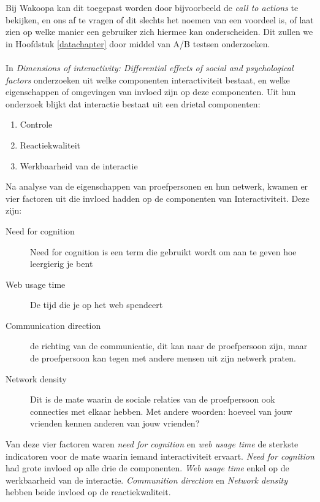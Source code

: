 \documentclass[a4paper, 10pt, pdftex]{article}
\begin{document}
      Bij Wakoopa kan dit toegepast worden door bijvoorbeeld de \emph{call to actions} te bekijken, en ons af te vragen of dit slechts het noemen van een voordeel is, of laat zien op welke manier een gebruiker zich hiermee kan onderscheiden. Dit zullen we in Hoofdstuk \ref{datachapter} door middel van A/B testsen onderzoeken.

     \paragraph{\cite{Sohn2005}}

      In \emph{Dimensions of interactivity: Differential effects of social and psychological factors} onderzoeken \cite{Sohn2005} uit welke componenten interactiviteit bestaat, en welke eigenschappen of omgevingen van invloed zijn op deze componenten. Uit hun onderzoek blijkt dat interactie bestaat uit een drietal componenten:
        \begin{enumerate}
          \item Controle
          \item Reactiekwaliteit
          \item Werkbaarheid van de interactie
        \end{enumerate}
      Na analyse van de eigenschappen van proefpersonen en hun netwerk, kwamen er vier factoren uit die invloed hadden op de componenten van Interactiviteit. Deze zijn:
        \begin{description}
          \item[Need for cognition]
            Need for cognition is een term die gebruikt wordt om aan te geven hoe leergierig je bent
          \item[Web usage time]
            De tijd die je op het web spendeert
          \item[Communication direction]
            de richting van de communicatie, dit kan naar de proefpersoon zijn, maar de proefpersoon kan tegen met andere mensen uit zijn netwerk praten.
          \item[Network density]
            Dit is de mate waarin de sociale relaties van de proefpersoon ook connecties met elkaar hebben. Met andere woorden: hoeveel van jouw vrienden kennen anderen van jouw vrienden?
        \end{description}
        Van deze vier factoren waren \emph{need for cognition} en \emph{web usage time} de sterkste indicatoren voor de mate waarin iemand interactiviteit ervaart. \emph{Need for cognition} had grote invloed op alle drie de componenten. \emph{Web usage time} enkel op de werkbaarheid van de interactie. \emph{Communition direction} en \emph{Network density} hebben beide invloed op de reactiekwaliteit.
\end{document}
